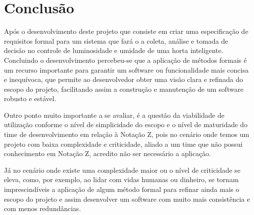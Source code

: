 \chapter{Conclusão}

Após o desenvolvimento deste projeto que consiste em criar uma especificação de requisitos formal para um sistema que fará o a coleta, análise e tomada de decisão no controle de luminosidade e umidade de uma horta inteligente. Concluindo o desenvolvimento percebeu-se que a aplicação de métodos formais é um recurso importante para garantir um software ou funcionalidade mais concisa e inequívoca, que permite ao desenvolvedor obter uma visão clara e refinada do escopo do projeto, facilitando assim a construção e manutenção de um software robusto e estável.

Outro ponto muito importante a se avaliar, é a questão da viabilidade de utilização conforme o nível de simplicidade do escopo e o nível de maturidade do time de desenvolvimento em relação à Notação Z, pois no cenário onde temos um projeto com baixa complexidade e criticidade, aliado a um time que não possui conhecimento em Notação Z, acredito não ser necessário a aplicação.

Já no cenário onde existe uma complexidade maior ou o nível de criticidade se eleva, como, por exemplo, ao lidar com  vidas humanas  ou dinheiro, se tornam imprescindíveis a aplicação de algum método formal para refinar ainda mais o escopo do projeto e assim desenvolver um software com muito mais consistência e com menos redundâncias.